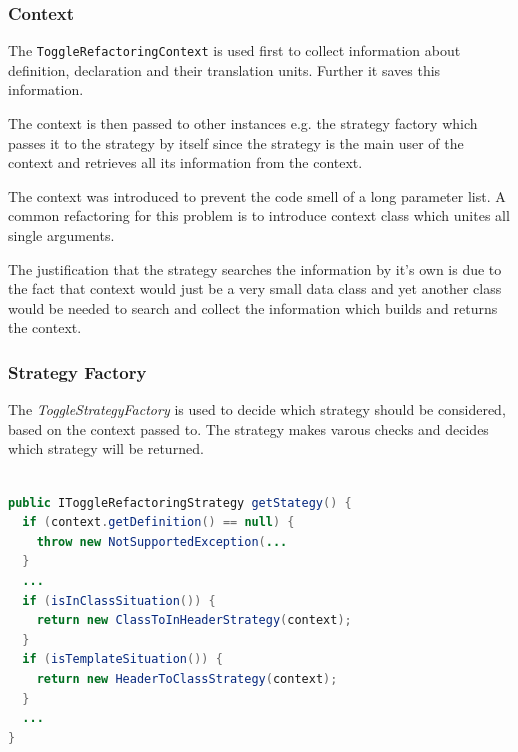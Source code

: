 \subsubsection{Context}

The \texttt{ToggleRefactoringContext} is used first to collect information
about definition, declaration and their translation units. Further it saves
this information.

The context is then passed to other instances e.g. the strategy factory which
passes it to the strategy by itself since the strategy is the main user of the
context and retrieves all its information from the context.

The context was introduced to prevent the code smell of a long parameter list. A
common refactoring for this problem is to introduce context class which unites
all single arguments.

The justification that the strategy searches the information by it's own is due
to the fact that context would just be a very small data class and yet another
class would be needed to search and collect the information which builds and
returns the context.

\subsubsection{Strategy Factory}

The \textit{ToggleStrategyFactory} is used to decide which strategy should be 
considered, based on the context passed to. The strategy makes varous checks
and decides which strategy will be returned.

\begin{lstlisting}[caption={IToggleRefactoringStrategy},
label={strategy}, language=Java]

public IToggleRefactoringStrategy getStategy() {
  if (context.getDefinition() == null) {
    throw new NotSupportedException(...
  }
  ...
  if (isInClassSituation()) {
    return new ClassToInHeaderStrategy(context);
  }
  if (isTemplateSituation()) {
    return new HeaderToClassStrategy(context);
  }
  ...
}
\end{lstlisting}


